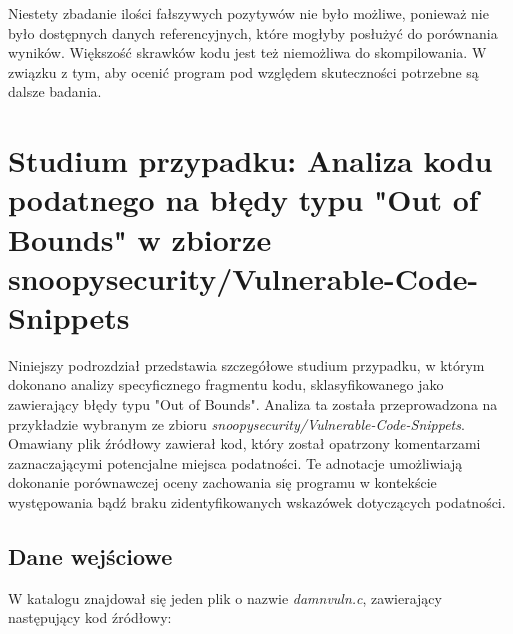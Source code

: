 Niestety zbadanie ilości fałszywych pozytywów nie było możliwe, ponieważ nie było dostępnych danych referencyjnych, które mogłyby posłużyć do porównania wyników. Większość skrawków kodu jest też niemożliwa do skompilowania. W związku z tym, aby ocenić program pod względem skuteczności potrzebne są dalsze badania.

\section{Studium przypadku: Analiza kodu podatnego na błędy typu "Out of Bounds" w zbiorze snoopysecurity/Vulnerable-Code-Snippets}
\label{sec:analiza_blednego_kodu}

Niniejszy podrozdział przedstawia szczegółowe studium przypadku, w którym dokonano analizy specyficznego fragmentu kodu, sklasyfikowanego jako zawierający błędy typu "Out of Bounds". Analiza ta została przeprowadzona na przykładzie wybranym ze zbioru \textit{snoopysecurity/Vulnerable-Code-Snippets}. Omawiany plik źródłowy zawierał kod, który został opatrzony komentarzami zaznaczającymi potencjalne miejsca podatności. Te adnotacje umożliwiają dokonanie porównawczej oceny zachowania się programu w kontekście występowania bądź braku zidentyfikowanych wskazówek dotyczących podatności.

\subsection{Dane wejściowe}
\label{subsec:dane_wejsciowe_i_oczekiwane_wyniki}
W katalogu znajdował się jeden plik o nazwie \textit{damnvuln.c}, zawierający następujący kod źródłowy:
     
              
              
